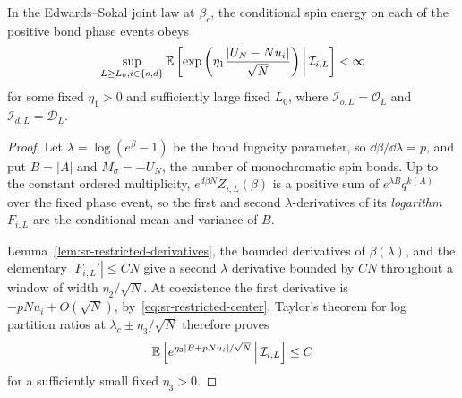 \begin{lemma}
\label{lem:sr-energy-transfer}
In the Edwards--Sokal joint law at $\beta_c$, the conditional spin
energy on each of the positive bond phase events obeys
\begin{equation}
 \sup_{L\ge L_0,i\in\{o,d\}}
 \mathbb E\left[\exp\left(\eta_1\frac{|U_N-Nu_i|}{\sqrt N}\right)
                 \,\middle|\,\mathcal I_{i,L}\right]<\infty
 \label{eq:sr-spin-phase-moment}
\end{equation}
for some fixed $\eta_1>0$ and sufficiently large fixed $L_0$, where
$\mathcal I_{o,L}=\mathcal O_L$ and
$\mathcal I_{d,L}=\mathcal D_L$.
\end{lemma}
\begin{proof}
Let $\lambda=\log(e^\beta-1)$ be the bond fugacity parameter, so
$\dd\beta/\dd\lambda=p$, and put $B=|A|$ and $M_\sigma=-U_N$, the
number of monochromatic spin bonds. Up to the constant ordered multiplicity,
$e^{d\beta N}Z_{i,L}(\beta)$ is a positive sum of
$e^{\lambda B}q^{k(A)}$ over the fixed phase event, so the first and
second $\lambda$-derivatives of its \emph{logarithm} $F_{i,L}$ are the
conditional mean and variance of $B$.

Lemma~\ref{lem:sr-restricted-derivatives}, the bounded derivatives of
$\beta(\lambda)$, and the elementary $|F_{i,L}'|\le CN$ give a second
$\lambda$ derivative bounded by $CN$ throughout a window of width
$\eta_2/\sqrt N$. At coexistence the first derivative is
$-pNu_i+O(\sqrt N)$, by~\eqref{eq:sr-restricted-center}.
Taylor's theorem for log partition ratios at
$\lambda_c\pm\eta_3/\sqrt N$ therefore proves
\begin{equation}
 \mathbb E\left[e^{\eta_3|B+pNu_i|/\sqrt N}
                     \,\middle|\,\mathcal I_{i,L}\right]\le C
 \label{eq:sr-bond-moment}
\end{equation}
for a sufficiently small fixed $\eta_3>0$.


\end{proof}
